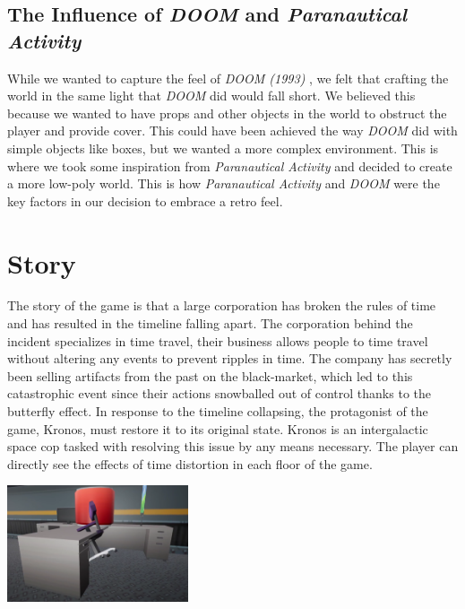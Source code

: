 \documentclass{sigchi}
\begin{document}
\subsection{The Influence of \textit{DOOM} and \textit{Paranautical Activity}}
While we wanted to capture the feel of \textit{DOOM (1993)} \cite{doom}, we felt that crafting the world in the same light that \textit{DOOM} did would fall short. We believed this because we wanted to have props and other objects in the world to obstruct the player and provide cover. This could have been achieved the way \textit{DOOM} did with simple objects like boxes, but we wanted a more complex environment. This is where we took some inspiration from \textit{Paranautical Activity} \cite{paranautical} and decided to create a more low-poly world. This is how \textit{Paranautical Activity} \cite{paranautical} and \textit{DOOM} were the key factors in our decision to embrace a retro feel.

\section{Story}
The story of the game is that a large corporation has broken the rules of time and has resulted in the timeline falling apart. The corporation behind the incident specializes in time travel, their business allows people to time travel without altering any events to prevent ripples in time. The company has secretly been selling artifacts from the past on the black-market, which led to this catastrophic event since their actions snowballed out of control thanks to the butterfly effect. In response to the timeline collapsing, the protagonist of the game, Kronos, must restore it to its original state. Kronos is an intergalactic space cop tasked with resolving this issue by any means necessary. The player can directly see the effects of time distortion in each floor of the game.
\begin{center}
    \includegraphics[width=0.4\textwidth]{timeMessedUp.png}
    \label{fig:time-dist}
\end{center}
\end{document}
